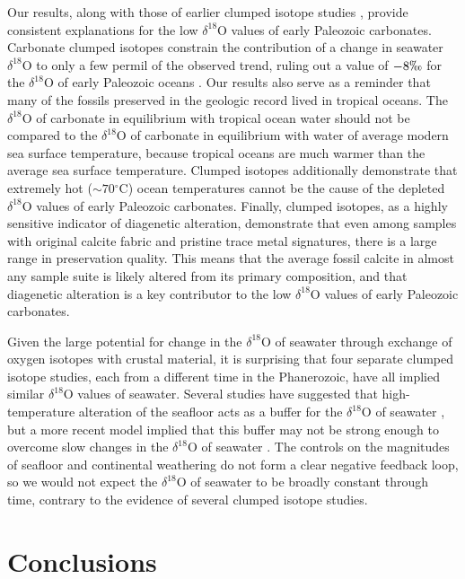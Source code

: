 \documentclass{article}
\newcommand{\deltao}{$\delta^{18}$}
\newcommand{\degrees}{$^{\circ}$}
\begin{document}
Our results, along with those of earlier clumped isotope studies \citep{Came2007,Finnegan2011,Dennis2013}, provide consistent explanations for the low \deltao O values of early Paleozoic carbonates. Carbonate clumped isotopes constrain the contribution of a change in seawater \deltao O to only a few permil of the observed trend, ruling out a value of $-8\permil$ for the \deltao O of early Paleozoic oceans \citep{Grossman2012}. Our results also serve as a reminder that many of the fossils preserved in the geologic record lived in tropical oceans. The \deltao O of carbonate in equilibrium with tropical ocean water should not be compared to the \deltao O of carbonate in equilibrium with water of average modern sea surface temperature, because tropical oceans are much warmer than the average sea surface temperature. Clumped isotopes additionally demonstrate that extremely hot ($\sim 70$\degrees C) ocean temperatures cannot be the cause of the depleted \deltao O values of early Paleozoic carbonates. Finally, clumped isotopes, as a highly sensitive indicator of diagenetic alteration, demonstrate that even among samples with original calcite fabric and pristine trace metal signatures, there is a large range in preservation quality. This means that the average fossil calcite in almost any sample suite is likely altered from its primary composition, and that diagenetic alteration is a key contributor to the low \deltao O values of early Paleozoic carbonates. 

Given the large potential for change in the \deltao O of seawater through exchange of oxygen isotopes with crustal material, it is surprising that four separate clumped isotope studies, each from a different time in the Phanerozoic, have all implied similar \deltao O values of seawater.  Several studies have suggested that high-temperature alteration of the seafloor acts as a buffer for the \deltao O of seawater \citep{Muehlenbachs1976,Gregory1981,Gregory1991,Muehlenbachs1998}, but a more recent model implied that this buffer may not be strong enough to overcome slow changes in the \deltao O of seawater \citep{Jaffres2007}. The controls on the magnitudes of seafloor and continental weathering do not form a clear negative feedback loop, so we would not expect the \deltao O of seawater to be broadly constant through time, contrary to the evidence of several clumped isotope studies. 

\section{Conclusions}
\end{document}
